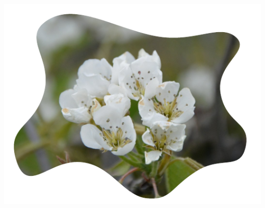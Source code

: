 \documentclass[t]{beamer}
\begin{document}
\begin{frame}
{			\begin{center}
				\includegraphics[height=0.5\textheight]{fig/bijsnijden}
			\end{center}
		}
	\end{frame}
\end{document}
